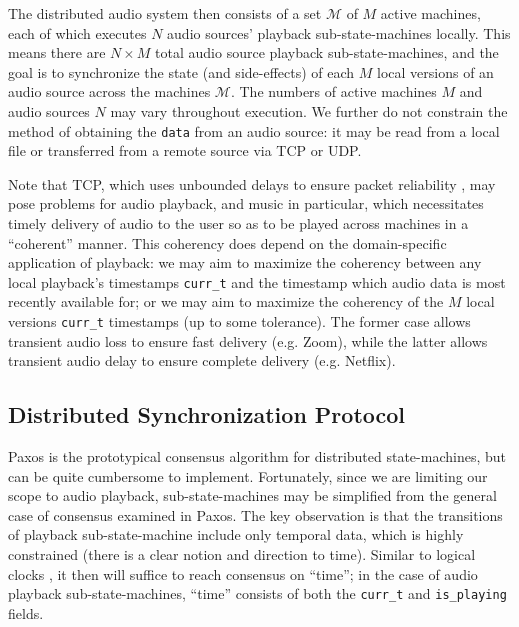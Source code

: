 \documentclass[%
               nonacm,sigconf,10pt]{acmart}
\newcommand{\py}[1]{\texttt{#1}}
\newcommand{\cM}{\mathcal{M}}
\begin{document}
The distributed audio system then consists of a set $\cM$ of $M$ active machines, each of which executes $N$ audio sources' playback sub-state-machines locally. This means there are $N \times M$ total audio source playback sub-state-machines, and the goal is to synchronize the state (and side-effects) of each $M$ local versions of an audio source across the machines $\cM$. The numbers of active machines $M$ and audio sources $N$ may vary throughout execution. We further do not constrain the method of obtaining the \py{data} from an audio source: it may be read from a local file or transferred from a remote source via TCP or UDP.

Note that TCP, which uses unbounded delays to ensure packet reliability \citep{KR16}, may pose problems for audio playback, and music in particular, which necessitates timely delivery of audio to the user so as to be played across machines in a ``coherent'' manner. This coherency does depend on the domain-specific application of playback: we may aim to maximize the coherency between any local playback's timestamps \py{curr_t} and the timestamp which audio data is most recently available for; or we may aim to maximize the coherency of the $M$ local versions \py{curr_t} timestamps (up to some tolerance). The former case allows transient audio loss to ensure fast delivery (e.g. Zoom), while the latter allows transient audio delay to ensure complete delivery (e.g. Netflix).

\iffalse
We have not yet considered the consistency, availability, and partition tolerance properties of a distributed audio system. The Consistent-Accessible-Partition Tolerant (CAP) Theorem \citep{Bre00, GL02} states that it is only possible to satisfy two-out-of-three of these properties simultaneously. .
\fi

\subsection{Distributed Synchronization Protocol}{\label{subsec:sync-proto}}

Paxos \citep{Lam98} is the prototypical consensus algorithm for distributed state-machines, but can be quite cumbersome to implement. Fortunately, since we are limiting our scope to audio playback, sub-state-machines may be simplified from the general case of consensus examined in Paxos. The key observation is that the transitions of playback sub-state-machine include only temporal data, which is highly constrained (there is a clear notion and direction to time). Similar to logical clocks \citep{Lam78}, it then will suffice to reach consensus on ``time''; in the case of audio playback sub-state-machines, ``time'' consists of both the \py{curr_t} and \py{is_playing} fields.
\end{document}
